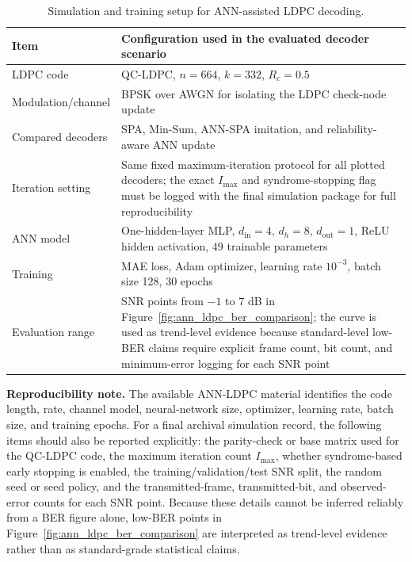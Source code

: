\begin{table}[H]
\centering
\caption{Simulation and training setup for ANN-assisted LDPC decoding.}
\label{tab:ann_ldpc_config}
\begin{tabularx}{\textwidth}{p{}Y}
\toprule
Item & Configuration used in the evaluated decoder scenario\\
\midrule
LDPC code & QC-LDPC, $n=664$, $k=332$, $R_c=0.5$\\
Modulation/channel & BPSK over AWGN for isolating the LDPC check-node update\\
Compared decoders & SPA, Min-Sum, ANN-SPA imitation, and reliability-aware ANN update\\
Iteration setting & Same fixed maximum-iteration protocol for all plotted decoders; the exact $I_{\max}$ and syndrome-stopping flag must be logged with the final simulation package for full reproducibility\\
ANN model & One-hidden-layer MLP, $d_{\mathrm{in}}=4$, $d_h=8$, $d_{\mathrm{out}}=1$, ReLU hidden activation, 49 trainable parameters\\
Training & MAE loss, Adam optimizer, learning rate $10^{-3}$, batch size 128, 30 epochs\\
Evaluation range & SNR points from $-1$ to $7$ dB in Figure~\ref{fig:ann_ldpc_ber_comparison}; the curve is used as trend-level evidence because standard-level low-BER claims require explicit frame count, bit count, and minimum-error logging for each SNR point\\
\bottomrule
\end{tabularx}
\end{table}

\noindent\textbf{Reproducibility note.} The available ANN-LDPC material identifies the code length, rate, channel model, neural-network size, optimizer, learning rate, batch size, and training epochs. For a final archival simulation record, the following items should also be reported explicitly: the parity-check or base matrix used for the QC-LDPC code, the maximum iteration count $I_{\max}$, whether syndrome-based early stopping is enabled, the training/validation/test SNR split, the random seed or seed policy, and the transmitted-frame, transmitted-bit, and observed-error counts for each SNR point. Because these details cannot be inferred reliably from a BER figure alone, low-BER points in Figure~\ref{fig:ann_ldpc_ber_comparison} are interpreted as trend-level evidence rather than as standard-grade statistical claims.

